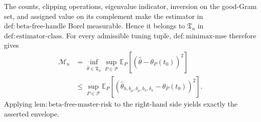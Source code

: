 The counts, clipping operations, eigenvalue indicator, inversion on the good-Gram set, and assigned value on its complement make the estimator in \(\mathrm{def:beta\text{-}free\text{-}handle}\) Borel measurable. Hence it belongs to \(\mathfrak T_n\) in \(\mathrm{def:estimator\text{-}class}\). For every admissible tuning tuple, \(\mathrm{def:minimax\text{-}mse}\) therefore gives
\[
\begin{aligned}
\mathcal M_n
&=
\inf_{\widehat\theta\in\mathfrak T_n}
\sup_{P\in\mathcal P}
\mathbb E_P[(\widehat\theta-\theta_P(t_0))^2]\\
&\le
\sup_{P\in\mathcal P}
\mathbb E_P[(\widehat\theta_{h,b_\mu,\delta_\mu,b_\pi,\delta_\pi}-\theta_P(t_0))^2].
\end{aligned}
\]
Applying \(\mathrm{lem:beta\text{-}free\text{-}master\text{-}risk}\) to the right-hand side yields exactly the asserted envelope.